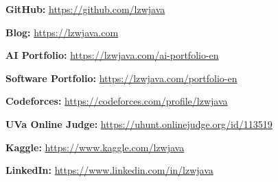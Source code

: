 
\begin{cventries}

  \cventry
    {} %
    {} %
    {} %
    {} %
    {
      \begin{cvitems}
        \item \textbf{GitHub:} \href{https://github.com/lzwjava}{https://github.com/lzwjava}
        \item \textbf{Blog:} \href{https://lzwjava.com}{https://lzwjava.com}
        \item \textbf{AI Portfolio:} \href{https://lzwjava.com/ai-portfolio-en}{https://lzwjava.com/ai-portfolio-en}
        \item \textbf{Software Portfolio:} \href{https://lzwjava.com/portfolio-en}{https://lzwjava.com/portfolio-en}
        \item \textbf{Codeforces:} \href{https://codeforces.com/profile/lzwjava}{https://codeforces.com/profile/lzwjava}
        \item \textbf{UVa Online Judge:} \href{https://uhunt.onlinejudge.org/id/113519}{https://uhunt.onlinejudge.org/id/113519}
        \item \textbf{Kaggle:} \href{https://www.kaggle.com/lzwjava}{https://www.kaggle.com/lzwjava}
        \item \textbf{LinkedIn:} \href{https://www.linkedin.com/in/lzwjava}{https://www.linkedin.com/in/lzwjava}
      \end{cvitems}
    }

\end{cventries}
